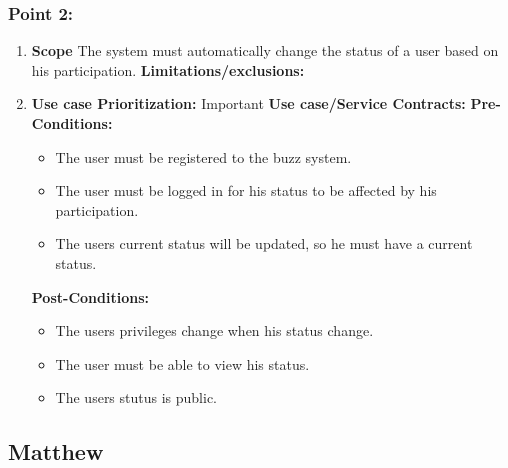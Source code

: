 \documentclass[11pt]{article}
\begin{document}
\subsubsection{Point 2:}
\begin{enumerate}
\item 
\textbf{Scope}
The system must automatically change the status of a user based on his participation.
\newline
\textbf{Limitations/exclusions:}
\item
\textbf{Use case Prioritization:} Important
\textbf{Use case/Service Contracts:} 
\newline
\textbf{Pre-Conditions: }
\begin{itemize}
\item The user must be registered to the buzz system.
\item The user must be logged in for his status to be affected by his participation.
\item The users current status will be updated, so he must have a current status.
\end{itemize}
 \textbf{Post-Conditions: }
\begin{itemize}
\item The users privileges change when his status change.
\item The user must be able to view his status.
\item The users stutus is public.
\end{itemize}
\end{enumerate}


\subsection{Matthew}
\end{document}

